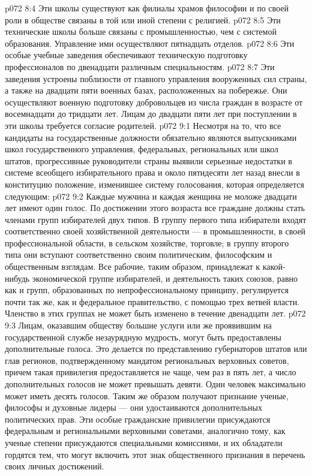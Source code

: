 \vs p072 8:4 \pc {}\bibnobreakspace {} Эти школы существуют как филиалы храмов философии и по своей роли в обществе связаны в той или иной степени с религией.
\vs p072 8:5 \pc {}\bibnobreakspace {} Эти технические школы больше связаны с промышленностью, чем с системой образования. Управление ими осуществляют пятнадцать отделов.
\vs p072 8:6 \pc {}\bibnobreakspace {} Эти особые учебные заведения обеспечивают техническую подготовку профессионалов по двенадцати различным специальностям.
\vs p072 8:7 \pc {}\bibnobreakspace {} Эти заведения устроены поблизости от главного управления вооруженных сил страны, а также на двадцати пяти военных базах, расположенных на побережье. Они осуществляют военную подготовку добровольцев из числа граждан в возрасте от восемнадцати до тридцати лет. Лицам до двадцати пяти лет при поступлении в эти школы требуется согласие родителей.
\vs p072 9:1 Несмотря на то, что все кандидаты на государственные должности обязательно являются выпускниками школ государственного управления, федеральных, региональных или школ штатов, прогрессивные руководители страны выявили серьезные недостатки в системе всеобщего избирательного права и около пятидесяти лет назад внесли в конституцию положение, изменившее систему голосования, которая определяется следующим:
\vs p072 9:2 \bibnobreakspace Каждые мужчина и каждая женщина не моложе двадцати лет имеют один голос. По достижении этого возраста все граждане должны стать членами групп избирателей двух типов. В группу первого типа избиратели входят соответственно своей хозяйственной деятельности --- в промышленности, в своей профессиональной области, в сельском хозяйстве, торговле; в группу второго типа они вступают соответственно своим политическим, философским и общественным взглядам. Все рабочие, таким образом, принадлежат к какой\hyp{}нибудь экономической группе избирателей, и деятельность таких союзов, равно как и групп, образованных по непрофессиональному принципу, регулируется почти так же, как и федеральное правительство, с помощью трех ветвей власти. Членство в этих группах не может быть изменено в течение двенадцати лет.
\vs p072 9:3 \pc {}\bibnobreakspace Лицам, оказавшим обществу большие услуги или же проявившим на государственной службе незаурядную мудрость, могут быть предоставлены дополнительные голоса. Это делается по представлению губернаторов штатов или глав регионов, подтвержденному мандатом региональных верховных советов, причем такая привилегия предоставляется не чаще, чем раз в пять лет, а число дополнительных голосов не может превышать девяти. Один человек максимально может иметь десять голосов. Таким же образом получают признание ученые, философы и духовные лидеры --- они удостаиваются дополнительных политических прав. Эти особые гражданские привилегии присуждаются федеральным и региональными верховными советами, аналогично тому, как ученые степени присуждаются специальными комиссиями, и их обладатели гордятся тем, что могут включить этот знак общественного признания в перечень своих личных достижений.
